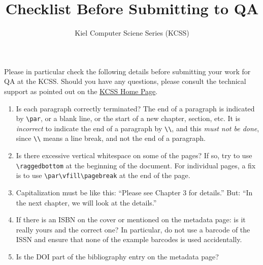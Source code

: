 \documentclass[11pt,twoside]{article}
\newcommand{\emphasis}[1]{\emph{#1}}
\begin{document}
\title{Checklist Before Submitting to QA}
\date{}
\author{Kiel Computer Sciene Series (KCSS)}
\maketitle
\noindent
Please in particular check the following details before submitting your work for QA at the KCSS.
Should you have any questions, please consult the technical support as
pointed out on the \href{http://informatik.uni-kiel.de/kcss}{KCSS Home Page}.
\begin{enumerate}[label=(\arabic*)]
\item Is each paragraph correctly terminated?
  The end of a paragraph is indicated by \lstinline|\par|,
  or a blank line, or the start of a new chapter, section, etc.
  It is \emphasis{incorrect} to indicate the end of a paragraph by \lstinline|\\|,
  and this \emphasis{must not be done}, since \lstinline|\\| means a line break, and not the end of a paragraph.
\item Is there excessive vertical whitespace on some of the pages?
  If so, try to use \lstinline|\raggedbottom| at the beginning of the document.
  For individual pages, a fix is to use \lstinline|\par\vfill\pagebreak| at the end of the page.
\item Capitalization must be like this:
  \enquote{Please see Chapter 3 for details.}
  But: \enquote{In the next chapter, we will look at the details.}
\item If there is an ISBN on the cover or mentioned on the metadata page:
  is it really yours and the correct one?
  In particular, do not use a barcode of the ISSN
  and ensure that none of the example barcodes is used accidentally.
\item Is the DOI part of the bibliography entry on the metadata page?
\end{enumerate}
\end{document}
